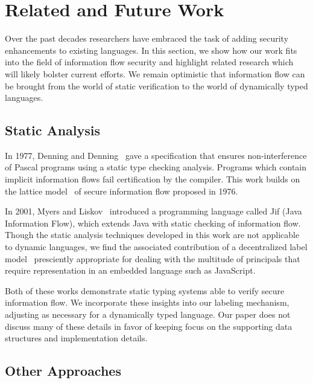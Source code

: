 \section{Related and Future Work}
\label{sec:relatedwork}


Over the past decades researchers have embraced the task of adding security enhancements to existing languages.
In this section, we show how our work fits into the field of information flow security and highlight related research which will likely bolster current efforts.
We remain optimistic that information flow can be brought from the world of static verification to the world of dynamically typed languages.

\subsection{Static Analysis}

In 1977, Denning and Denning~\cite{359712} gave a specification that ensures non-interference of Pascal programs using a static type checking analysis.
Programs which contain implicit information flows fail certification by the compiler.
This work builds on the lattice model~\cite{denning1976lattice} of secure information flow proposed in 1976.

In 2001, Myers and Liskov~\cite{myers2001jif} introduced a programming language called Jif (Java Information Flow), which extends Java with static checking of information flow.
Though the static analysis techniques developed in this work are not applicable to dynamic languages, we find the associated contribution of a decentralized label model~\cite{363526} presciently appropriate for dealing with the multitude of principals that require representation in an embedded language such as JavaScript.

Both of these works demonstrate static typing systems able to verify secure information flow.
We incorporate these insights into our labeling mechanism, adjusting as necessary for a dynamically typed language.
Our paper does not discuss many of these details in favor of keeping focus on the supporting data structures and implementation details.

\subsection{Other Approaches}

